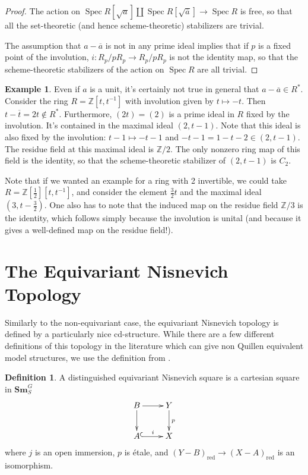 \documentclass[edeposit,fullpage]{uiucthesis2009}
\newcommand{\Z}{\mathbb Z}
\newcommand{\Sm}[1]{\mathbf{Sm}_{#1}}
\DeclareMathOperator{\Spec}{Spec}
\theoremstyle{plain}
\numberwithin{lemma}{section}
\theoremstyle{definition}
\newtheorem{example}[lemma]{Example}
\newtheorem{definition}[lemma]{Definition}
\begin{document}
\begin{proof}
The action on $ \Spec R[\sqrt{a}] \coprod \Spec
R[\sqrt{\overline a}] \rightarrow \Spec R$ is free, so that all the
set-theoretic (and hence scheme-theoretic) stabilizers are trivial. 

The assumption that $a - \overline a$ is not in any prime ideal implies that
if $p$ is a fixed point of the involution, $i : R_p/pR_p \rightarrow
R_p/pR_p$ is not the identity map, so that the scheme-theoretic
stabilizers of the action on $\Spec R$ are all trivial.
\end{proof}

\begin{example}
Even if $a$ is a unit, it's certainly not true in general that
$ a - \overline a \in R^*$. Consider the ring $R = \Z[t,t^{-1}]$ with
involution given by $t \mapsto -t$. Then $t - \overline t = 2t \not
\in R^*$. Furthermore, $(2t) = (2)$ is a prime ideal in $R$ fixed by
the involution. It's contained in the maximal ideal $(2,t-1)$. Note
that this ideal is also fixed by the involution: $t - 1 \mapsto -t-1$
and $-t-1 = 1-t -2 \in (2,t-1)$. The residue field at this maximal
ideal is $\Z/2$. The only nonzero ring map of this field is the
identity, so that the scheme-theoretic stabilizer of $(2,t-1)$ is
$C_2$.

Note that if we wanted an example for a ring with 2 invertible, we
could take $R=\Z[\frac{1}{2}][t,t^{-1}]$, and consider the element
$\frac{3}{2}t$ and the maximal ideal $(3,t-\frac{3}{2})$. One also has
to note that the induced map on the residue field $\Z/3$ is the
identity, which follows simply because the involution is unital (and
because it gives a well-defined map on the residue field!).
\end{example}

\section{The Equivariant Nisnevich Topology}

Similarly to the non-equivariant case, the equivariant Nisnevich
topology is defined by a particularly nice cd-structure. While there are
a few different definitions of this topology in the literature which
can give non Quillen equivalent model structures, we use the
definition from \cite{GrpSchHell}.

\begin{definition}
A distinguished equivariant Nisnevich square is a cartesian square in
$\Sm{S}^G$
\[
\xymatrix{B \ar[r]\ar[d] & Y \ar[d]^p \\ A \ar@{^{(}->}[r]^i & X}
\]
where $j$ is an open immersion, $p$ is \'etale, and
$(Y-B)_{\mathrm{red}} \rightarrow (X-A)_{\mathrm{red}}$ is an
isomorphism. 
\end{definition}
\end{document}
